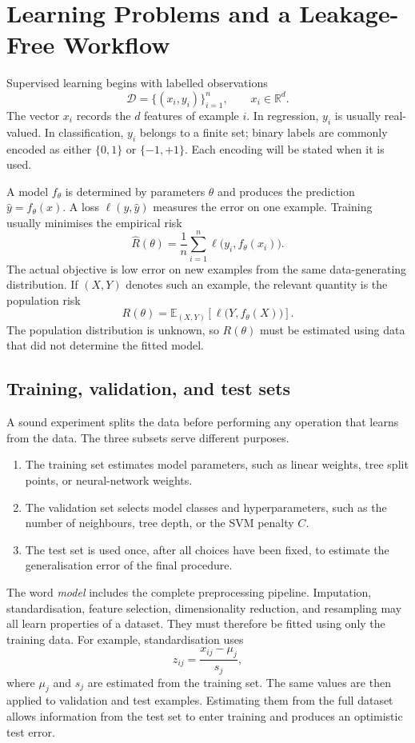 

\section{Learning Problems and a Leakage-Free Workflow}
\label{sec:risk-workflow}

Supervised learning begins with labelled observations
\[
\mathcal D=\{(x_i,y_i)\}_{i=1}^{n},
\qquad x_i\in\mathbb R^d.
\]
The vector $x_i$ records the $d$ features of example $i$. In regression,
$y_i$ is usually real-valued. In classification, $y_i$ belongs to a finite set;
binary labels are commonly encoded as either $\{0,1\}$ or $\{-1,+1\}$.
Each encoding will be stated when it is used.

A model $f_\theta$ is determined by parameters $\theta$ and produces the
prediction $\hat y=f_\theta(x)$. A loss $\ell(y,\hat y)$ measures the error on
one example. Training usually minimises the empirical risk
\[
\widehat R(\theta)
=\frac{1}{n}\sum_{i=1}^{n}\ell\bigl(y_i,f_\theta(x_i)\bigr).
\]
The actual objective is low error on new examples from the same data-generating
distribution. If $(X,Y)$ denotes such an example, the relevant quantity is the
population risk
\[
R(\theta)=\mathbb E_{(X,Y)}
\left[\ell\bigl(Y,f_\theta(X)\bigr)\right].
\]
The population distribution is unknown, so $R(\theta)$ must be estimated using
data that did not determine the fitted model.

\subsection{Training, validation, and test sets}

A sound experiment splits the data before performing any operation that learns
from the data. The three subsets serve different purposes.
\begin{enumerate}
    \item The training set estimates model parameters, such as linear weights,
    tree split points, or neural-network weights.
    \item The validation set selects model classes and hyperparameters, such as
    the number of neighbours, tree depth, or the SVM penalty $C$.
    \item The test set is used once, after all choices have been fixed, to
    estimate the generalisation error of the final procedure.
\end{enumerate}

The word \emph{model} includes the complete preprocessing pipeline. Imputation,
standardisation, feature selection, dimensionality reduction, and resampling
may all learn properties of a dataset. They must therefore be fitted using only
the training data. For example, standardisation uses
\[
z_{ij}=\frac{x_{ij}-\mu_j}{s_j},
\]
where $\mu_j$ and $s_j$ are estimated from the training set. The same values
are then applied to validation and test examples. Estimating them from the full
dataset allows information from the test set to enter training and produces an
optimistic test error.

